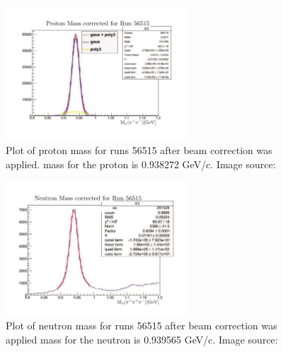 \begin{figure}\begin{center}
\includegraphics[width=0.6\textwidth]{figures/calib/tag/ecor/FixedmisssingmassII.pdf}
\caption[Proton Mass for Run 56515 After Beam Correction]{\label{fig:proton.fix} Plot of proton mass for runs 56515 after beam correction was applied.   mass for the proton is 0.938272 GeV/c. Image source:~\cite{clas.thesis.kunkel}}
\end{center}\end{figure}

\begin{figure}\begin{center}
\includegraphics[width=0.6\textwidth]{figures/calib/tag/ecor/FixedmisssingmassneutronII.pdf}
\caption[Neutron Mass for Run 56515 After Beam Correction]{\label{fig:neutron.fix} Plot of neutron mass for runs 56515 after beam correction was applied   mass for the neutron is 0.939565 GeV/c. Image source:~\cite{clas.thesis.kunkel}}
\end{center}\end{figure}

